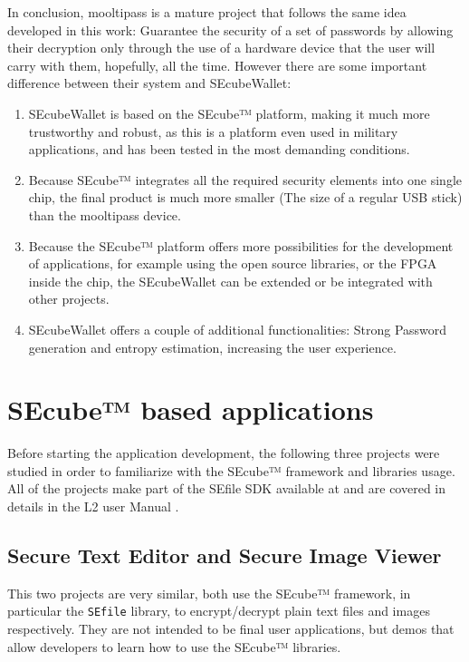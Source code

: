 In conclusion, mooltipass is a mature project that follows the same idea developed in this work: Guarantee the security of a set of passwords by allowing their decryption only through the use of a hardware device that the user will carry with them, hopefully, all the time. However there are some important difference between their system and SEcubeWallet:
\begin{enumerate}
\setlength\itemsep{-3pt}
\item SEcubeWallet is based on the SEcube™ platform, making it much more trustworthy and robust, as this is a platform even used in military applications, and has been tested in the most demanding conditions.

\item Because SEcube™ integrates all the required security elements into one single chip, the final product is much more smaller (The size of a regular USB stick) than the mooltipass device.

\item Because the SEcube™ platform offers more possibilities for the development of applications, for example using the open source libraries, or the FPGA inside the chip, the SEcubeWallet can be extended or be integrated with other projects.

\item SEcubeWallet offers a couple of additional functionalities: Strong Password generation and entropy estimation, increasing the user experience.
\end{enumerate}

\section{SEcube™ based applications}

Before starting the application development, the following three projects were studied in order to familiarize with the SEcube™ framework and libraries usage. All of the projects make part of the SEfile SDK available at \cite{SEcubeRes} and are covered in details in the L2 user Manual \cite{L2UserMan}.

\subsection{Secure Text Editor and Secure Image Viewer}

This two projects are very similar, both use the SEcube™ framework, in particular the \texttt{SEfile} library, to encrypt/decrypt plain text files and images respectively. They are not intended to be final user applications, but demos that allow developers to learn how to use the SEcube™ libraries.


